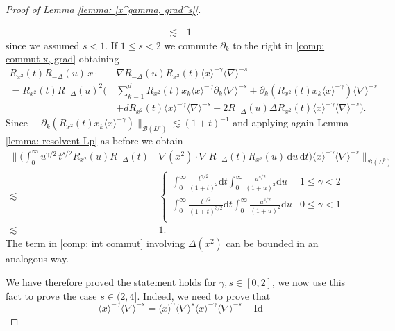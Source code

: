\documentclass[12pt]{article}
\theoremstyle{plain}
\begin{document}
\begin{proof}[Proof of Lemma \ref{lemma: [x^gamma, grad^s]}]
\begin{itemize}
\begin{align}
        \lesssim &\, 1  \label{comp: bound [x^g, grad^s]}
    \end{align}
    since we assumed $s<1$. If $1\leq s <2$ we commute $\partial_k$ to the right in \eqref{comp: commut x, grad} obtaining 
    \begin{align*}
       R_{x^2}(t)R_{-\Delta} (u) \, x\cdot &\nabla R_{-\Delta} (u)R_{x^2}(t) \langle x \rangle^{-\gamma} \langle \nabla \rangle^{-s}\\
        =  R_{x^2}(t) R_{-\Delta} (u)^2 \big( \,& \sum_{k=1}^d R_{x^2}(t) x_k \langle x \rangle^{-\gamma} \partial_k \langle \nabla \rangle^{-s}  +  \partial_k (R_{x^2}(t) x_k \langle x \rangle^{-\gamma} )  \langle \nabla \rangle^{-s}\\
         & + d R_{x^2}(t) \langle x \rangle^{-\gamma} \langle \nabla \rangle^{-s} -2R_{-\Delta} (u) \Delta R_{x^2}(t)  \langle x \rangle^{-\gamma} \langle \nabla \rangle^{-s}\big). 
  \end{align*}
    Since $ \|\partial_k (R_{x^2}(t) x_k \langle x \rangle^{-\gamma} ) \|_{\mathcal{B}(L^p)}\lesssim (1+t)^{-1}$ and applying again Lemma \ref{lemma: resolvent Lp} as before we obtain 
    \begin{align*}
      \Big\| \Big (\int_0^\infty u^{\gamma/2}\,t^{s/2} R_{x^2}(u)R_{-\Delta} (t) \, &\nabla(x^2)\cdot \nabla\,R_{-\Delta} (t)R_{x^2} (u)\, \mathrm{d}u\, \mathrm{d}t\Big ) \langle x \rangle^{-\gamma} \langle \nabla \rangle^{-s}\Big\|_{\mathcal{B}(L^p)}\\
      \lesssim  & \begin{cases}
            \int_0^\infty \frac{t^{\gamma/2}}{(1+t)^2} \mathrm{d}t  \int_0^\infty \frac{u^{s/2}}{(1+u)^{2}}  \mathrm{d}u & 1\leq \gamma <2\\
            \int _0^\infty \frac{t^{\gamma/2}}{(1+t)^{3/2}} \mathrm{d}t  \int_0^\infty \frac{u^{s/2}}{(1+u)^{2}}  \mathrm{d}u & 0\leq \gamma <1\\
        \end{cases}\\
        \lesssim & 1 .
    \end{align*}
    The term in \eqref{comp: int commut} involving $\Delta (x^2)$ can be bounded in an analogous way.
    \end{itemize}
     We have therefore proved the statement holds for $\gamma, s \in [0, 2]$, we now use this fact to prove the case $s \in (2, 4]$. Indeed, we need to prove that 
     \begin{equation*}
         [\langle x \rangle^\gamma , \langle \nabla \rangle^s]\langle x \rangle^{-\gamma} \langle \nabla \rangle^{-s} = \langle x \rangle^\gamma \langle \nabla \rangle^s \langle x \rangle^{-\gamma }\langle \nabla \rangle^{-s} - \mathrm{Id}

\end{equation*}
\end{proof}
\end{document}
